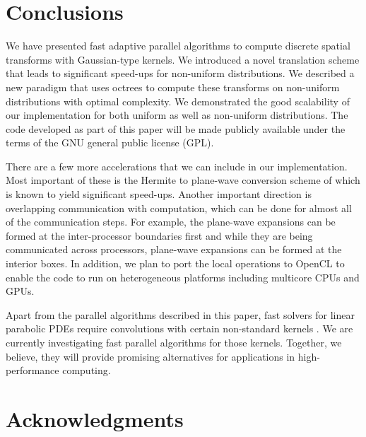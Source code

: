 \documentclass[conference]{IEEEtran}
\begin{document}
\section{Conclusions}
\label{sc:conclusions}
We have presented fast adaptive parallel algorithms to compute discrete spatial transforms with Gaussian-type kernels.
We introduced a novel translation scheme that leads to significant speed-ups for non-uniform distributions. We described a
 new paradigm that uses octrees to compute these transforms on non-uniform distributions with optimal complexity. 
 We demonstrated the good scalability of our implementation for both uniform as well as non-uniform distributions. The
 code developed as part of this paper will be made publicly available under the terms of the GNU general public license (GPL). 

There are a few more accelerations that we can include in our implementation. Most important of these is the Hermite to 
plane-wave conversion scheme of \cite{fggt} which is known to yield significant speed-ups. Another important direction
 is overlapping communication with computation, which can be done for almost all of the communication steps. For example, 
 the plane-wave expansions can be formed at the inter-processor boundaries first and while they are being communicated 
 across processors, plane-wave expansions can be formed at the interior boxes. In addition, we plan to port
 the local operations to OpenCL \cite{opencl} to enable the code to run on heterogeneous platforms including multicore CPUs and GPUs.

Apart from the parallel algorithms described in this paper, fast solvers for linear parabolic PDEs 
require convolutions with certain non-standard kernels \cite{li09, skv09}. We are currently investigating fast 
parallel algorithms for those kernels. Together, we believe, they will provide promising alternatives 
for applications in high-performance computing. 

\section*{Acknowledgments}




\end{document}
